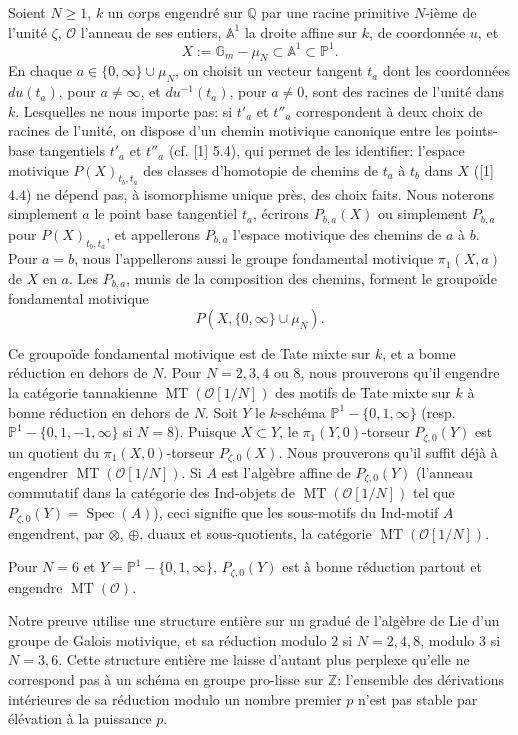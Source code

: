 \documentclass[10pt,a4paper]{article}
\newcommand{\Gm}{\mathbb G_m}
\newcommand{\Q}{\mathbb Q}
\newcommand{\Z}{\mathbb Z}
\newcommand{\A}{\mathbb A}
\newcommand{\Pone}{\mathbb P^1}
\newcommand{\Spec}{\operatorname{Spec}}
\newcommand{\MT}{\operatorname{MT}}
\newcommand{\OO}{\mathcal O}
\theoremstyle{deligne}
\begin{document}
Soient \(N\ge1\), \(k\) un corps engendré sur \(\Q\) par une racine primitive \(N\)-ième de l'unité \(\zeta\), \(\OO\) l'anneau de ses entiers, \(\A^1\) la droite affine sur \(k\), de coordonnée \(u\), et
\[
X:=\Gm-\mu_N\subset \A^1\subset \Pone .
\]
En chaque \(a\in\{0,\infty\}\cup\mu_N\), on choisit un vecteur tangent \(t_a\) dont les coordonnées \(du(t_a)\), pour \(a\ne\infty\), et \(d u^{-1}(t_a)\), pour \(a\ne0\), sont des racines de l'unité dans \(k\). Lesquelles ne nous importe pas: si \(t'_a\) et \(t''_a\) correspondent à deux choix de racines de l'unité, on dispose d'un chemin motivique canonique entre les points-base tangentiels \(t'_a\) et \(t''_a\) (cf. [1] 5.4), qui permet de les identifier: l'espace motivique \(P(X)_{t_b,t_a}\) des classes d'homotopie de chemins de \(t_a\) à \(t_b\) dans \(X\) ([1] 4.4) ne dépend pas, à isomorphisme unique près, des choix faits. Nous noterons simplement \(a\) le point base tangentiel \(t_a\), écrirons \(P_{b,a}(X)\) ou simplement \(P_{b,a}\) pour \(P(X)_{t_b,t_a}\), et appellerons \(P_{b,a}\) l'espace motivique des chemins de \(a\) à \(b\). Pour \(a=b\), nous l'appellerons aussi le groupe fondamental motivique \(\pi_1(X,a)\) de \(X\) en \(a\). Les \(P_{b,a}\), munis de la composition des chemins, forment le groupoïde fondamental motivique
\[
P(X,\{0,\infty\}\cup\mu_N).
\]

Ce groupoïde fondamental motivique est de Tate mixte sur \(k\), et a bonne réduction en dehors de \(N\). Pour \(N=2,3,4\) ou \(8\), nous prouverons qu'il engendre la catégorie tannakienne \(\MT(\OO[1/N])\) des motifs de Tate mixte sur \(k\) à bonne réduction en dehors de \(N\). Soit \(Y\) le \(k\)-schéma \(\Pone-\{0,1,\infty\}\) (resp. \(\Pone-\{0,1,-1,\infty\}\) si \(N=8\)). Puisque \(X\subset Y\), le \(\pi_1(Y,0)\)-torseur \(P_{\zeta,0}(Y)\) est un quotient du \(\pi_1(X,0)\)-torseur \(P_{\zeta,0}(X)\). Nous prouverons qu'il suffit déjà à engendrer \(\MT(\OO[1/N])\). Si \(A\) est l'algèbre affine de \(P_{\zeta,0}(Y)\) (l'anneau commutatif dans la catégorie des Ind-objets de \(\MT(\OO[1/N])\) tel que \(P_{\zeta,0}(Y)=\Spec(A)\)), ceci signifie que les sous-motifs du Ind-motif \(A\) engendrent, par \(\otimes\), \(\oplus\), duaux et sous-quotients, la catégorie \(\MT(\OO[1/N])\).

Pour \(N=6\) et \(Y=\Pone-\{0,1,\infty\}\), \(P_{\zeta,0}(Y)\) est à bonne réduction partout et engendre \(\MT(\OO)\).

Notre preuve utilise une structure entière sur un gradué de l'algèbre de Lie d'un groupe de Galois motivique, et sa réduction modulo \(2\) si \(N=2,4,8\), modulo \(3\) si \(N=3,6\). Cette structure entière me laisse d'autant plus perplexe qu'elle ne correspond pas à un schéma en groupe pro-lisse sur \(\Z\): l'ensemble des dérivations intérieures de sa réduction modulo un nombre premier \(p\) n'est pas stable par élévation à la puissance \(p\).
\end{document}
